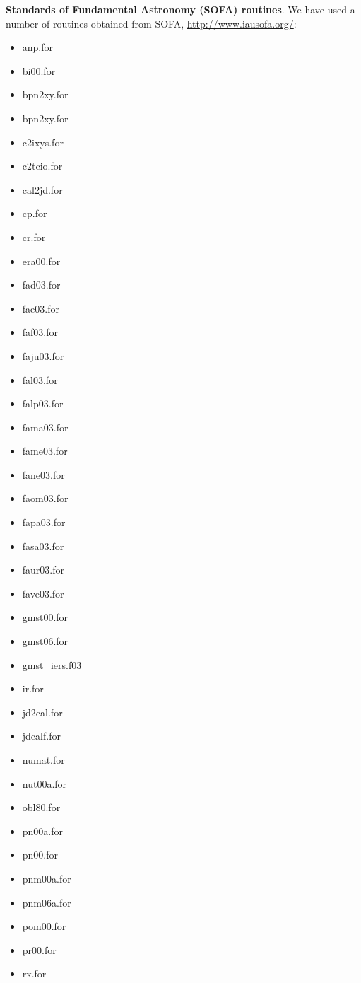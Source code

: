 \noindent\textbf{Standards of Fundamental Astronomy (SOFA) routines}. We have used a number of routines obtained from SOFA, \url{http://www.iausofa.org/}:
\begin{itemize}
    \item anp.for
    \item bi00.for
    \item bpn2xy.for
    \item bpn2xy.for
    \item c2ixys.for
    \item c2tcio.for
    \item cal2jd.for
    \item cp.for
    \item cr.for
    \item era00.for
    \item fad03.for
    \item fae03.for
    \item faf03.for
    \item faju03.for
    \item fal03.for
    \item falp03.for
    \item fama03.for
    \item fame03.for
    \item fane03.for
    \item faom03.for
    \item fapa03.for
    \item fasa03.for
    \item faur03.for
    \item fave03.for
    \item gmst00.for
    \item gmst06.for
    \item gmst\_iers.f03
    \item ir.for
    \item jd2cal.for
    \item jdcalf.for
    \item numat.for
    \item nut00a.for
    \item obl80.for
    \item pn00a.for
    \item pn00.for
    \item pnm00a.for
    \item pnm06a.for
    \item pom00.for
    \item pr00.for
    \item rx.for

\end{itemize}
